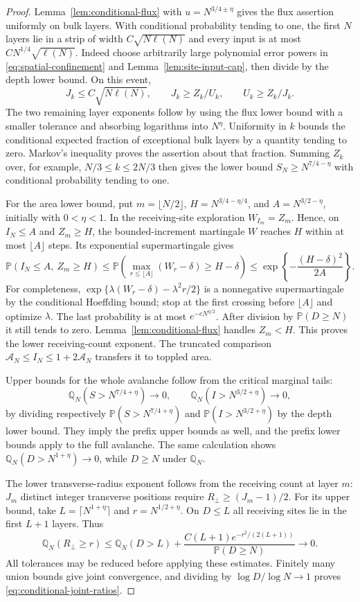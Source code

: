 \documentclass[11pt]{article}
\numberwithin{equation}{section}
\theoremstyle{definition}
\newcommand{\Prob}{\mathbb P}
\begin{document}
\begin{proof}
Lemma~\ref{lem:conditional-flux} with $u=N^{3/4\pm\eta}$ gives the flux assertion uniformly on bulk layers. With conditional probability tending to one, the first $N$ layers lie in a strip of width $C\sqrt{N\ell(N)}$ and every input is at most $C N^{1/4}\sqrt{\ell(N)}$. Indeed choose arbitrarily large polynomial error powers in \eqref{eq:spatial-confinement} and Lemma~\ref{lem:site-input-cap}, then divide by the depth lower bound. On this event,
\[
 J_k\le C\sqrt{N\ell(N)},\qquad
 J_k\ge Z_k/U_k,\qquad U_k\ge Z_k/J_k.
\]
The two remaining layer exponents follow by using the flux lower bound with a smaller tolerance and absorbing logarithms into $N^\eta$. Uniformity in $k$ bounds the conditional expected fraction of exceptional bulk layers by a quantity tending to zero. Markov's inequality proves the assertion about that fraction. Summing $Z_k$ over, for example, $N/3\le k\le2N/3$ then gives the lower bound $S_N\ge N^{7/4-\eta}$ with conditional probability tending to one.

For the area lower bound, put $m=\lfloor N/2\rfloor$, $H=N^{3/4-\eta/4}$, and $A=N^{3/2-\eta}$, initially with $0<\eta<1$. In the receiving-site exploration $W_{I_m}=Z_m$. Hence, on $I_N\le A$ and $Z_m\ge H$, the bounded-increment martingale $W$ reaches $H$ within at most $\lfloor A\rfloor$ steps. Its exponential supermartingale gives
\[
 \Prob(I_N\le A,\ Z_m\ge H)
 \le\Prob\left(\max_{r\le\lfloor A\rfloor}(W_r-\delta)\ge H-\delta\right)
 \le\exp\left\{-\frac{(H-\delta)^2}{2A}\right\}.
\]
For completeness, $\exp\{\lambda(W_r-\delta)-\lambda^2r/2\}$ is a nonnegative supermartingale by the conditional Hoeffding bound; stop at the first crossing before $\lfloor A\rfloor$ and optimize $\lambda$. The last probability is at most $e^{-cN^{\eta/2}}$. After division by $\Prob(D\ge N)$ it still tends to zero. Lemma~\ref{lem:conditional-flux} handles $Z_m<H$. This proves the lower receiving-count exponent. The truncated comparison $\mathcal A_N\le I_N\le1+2\mathcal A_N$ transfers it to toppled area.

Upper bounds for the whole avalanche follow from the critical marginal tails:
\[
 \mathbb Q_N(S>N^{7/4+\eta})\longrightarrow0,\qquad
 \mathbb Q_N(I>N^{3/2+\eta})\longrightarrow0,
\]
by dividing respectively $\Prob(S>N^{7/4+\eta})$ and $\Prob(I>N^{3/2+\eta})$ by the depth lower bound. They imply the prefix upper bounds as well, and the prefix lower bounds apply to the full avalanche. The same calculation shows $\mathbb Q_N(D>N^{1+\eta})\to0$, while $D\ge N$ under $\mathbb Q_N$.

The lower transverse-radius exponent follows from the receiving count at layer $m$: $J_m$ distinct integer transverse positions require $R_\perp\ge(J_m-1)/2$. For its upper bound, take $L=\lceil N^{1+\eta}\rceil$ and $r=N^{1/2+\eta}$. On $D\le L$ all receiving sites lie in the first $L+1$ layers. Thus
\[
 \mathbb Q_N(R_\perp\ge r)
 \le\mathbb Q_N(D>L)+
 \frac{C(L+1)e^{-r^2/(2(L+1))}}{\Prob(D\ge N)}\longrightarrow0.
\]
All tolerances may be reduced before applying these estimates. Finitely many union bounds give joint convergence, and dividing by $\log D/\log N\to1$ proves \eqref{eq:conditional-joint-ratios}.
\end{proof}
\end{document}
